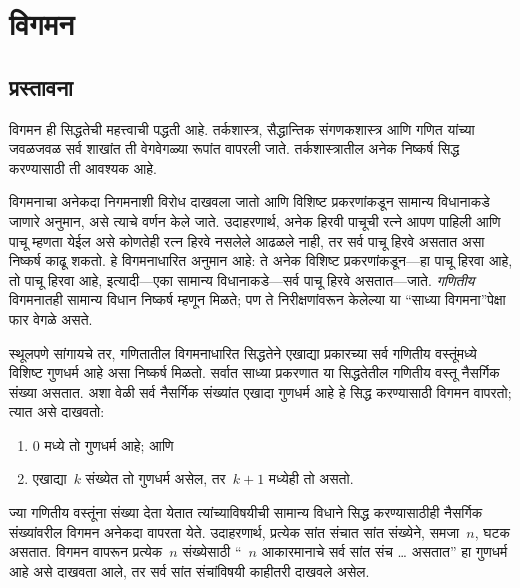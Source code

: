 \chapter{विगमन}\label{mth:ind:chap}









\section{प्रस्तावना}\label{mth:ind:int:sec}

विगमन ही सिद्धतेची महत्त्वाची पद्धती आहे. तर्कशास्त्र, सैद्धान्तिक संगणकशास्त्र आणि गणित यांच्या जवळजवळ सर्व शाखांत ती वेगवेगळ्या रूपांत वापरली जाते. तर्कशास्त्रातील अनेक निष्कर्ष सिद्ध करण्यासाठी ती आवश्यक आहे.

विगमनाचा अनेकदा निगमनाशी विरोध दाखवला जातो आणि विशिष्ट प्रकरणांकडून सामान्य विधानाकडे जाणारे अनुमान, असे त्याचे वर्णन केले जाते. उदाहरणार्थ, अनेक हिरवी पाचूची रत्ने आपण पाहिली आणि पाचू म्हणता येईल असे कोणतेही रत्न हिरवे नसलेले आढळले नाही, तर सर्व पाचू हिरवे असतात असा निष्कर्ष काढू शकतो. हे विगमनाधारित अनुमान आहे: ते अनेक विशिष्ट प्रकरणांकडून---हा पाचू हिरवा आहे, तो पाचू हिरवा आहे, इत्यादी---एका सामान्य विधानाकडे---सर्व पाचू हिरवे असतात---जाते. \emph{गणितीय} विगमनातही सामान्य विधान निष्कर्ष म्हणून मिळते; पण ते निरीक्षणांवरून केलेल्या या “साध्या विगमना”पेक्षा फार वेगळे असते.

स्थूलपणे सांगायचे तर, गणितातील विगमनाधारित सिद्धतेने एखाद्या प्रकारच्या सर्व गणितीय वस्तूंमध्ये विशिष्ट गुणधर्म आहे असा निष्कर्ष मिळतो. सर्वात साध्या प्रकरणात या सिद्धतेतील गणितीय वस्तू नैसर्गिक संख्या असतात. अशा वेळी सर्व नैसर्गिक संख्यांत एखादा गुणधर्म आहे हे सिद्ध करण्यासाठी विगमन वापरतो; त्यात असे दाखवतो:
\begin{enumerate}
\item $0$ मध्ये तो गुणधर्म आहे; आणि
\item एखाद्या~$k$ संख्येत तो गुणधर्म असेल, तर~$k+1$ मध्येही तो असतो.
\end{enumerate}
ज्या गणितीय वस्तूंना संख्या देता येतात त्यांच्याविषयीची सामान्य विधाने सिद्ध करण्यासाठीही नैसर्गिक संख्यांवरील विगमन अनेकदा वापरता येते. उदाहरणार्थ, प्रत्येक सांत संचात सांत संख्येने, समजा~$n$, घटक असतात. विगमन वापरून प्रत्येक~$n$ संख्येसाठी “~$n$ आकारमानाचे सर्व सांत संच \dots{} असतात” हा गुणधर्म आहे असे दाखवता आले, तर सर्व सांत संचांविषयी काहीतरी दाखवले असेल.

